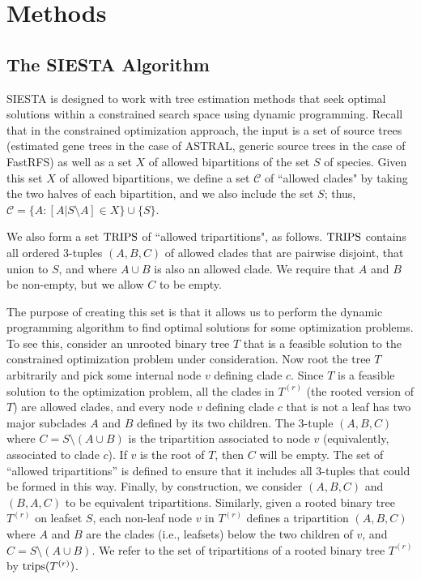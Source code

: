 \section{Methods}

\subsection{The SIESTA Algorithm}

SIESTA is designed to work with tree estimation methods that seek optimal solutions within a constrained search space using dynamic programming. 
Recall that in the constrained optimization approach, the input  is a set of source trees (estimated gene trees in the case of ASTRAL, generic source trees in the case of FastRFS) as well as a set $X$ of allowed bipartitions of the set $S$ of species.
Given this set $X$ of allowed bipartitions, we define a set $\mathcal{C}$ of ``allowed clades" by taking the two halves of each bipartition, and we also include the set $S$; thus, $\mathcal{C} = \{A: [A|S \setminus A] \in X \} \cup \{S\}$.

We also form a set $\mathop{\rm TRIPS}$ of ``allowed tripartitions", as follows. 
$\mathop{\rm TRIPS}$ contains all ordered 3-tuples $(A,B,C)$ of allowed clades that are pairwise disjoint, that union to $S$, and where $A \cup B$ is also an allowed clade. 
We require that $A$ and $B$ be non-empty, but we allow $C$ to be empty.

The purpose of creating this set is that it allows us to perform the dynamic programming algorithm to find optimal solutions for some optimization problems.
To see this, consider an unrooted binary tree $T$ that is a feasible solution to the constrained optimization problem under consideration.
Now root the tree $T$ arbitrarily and pick some internal node $v$ defining clade $c$.
Since $T$ is a feasible solution to the optimization problem, all the clades in $T^{(r)}$  (the rooted version of $T$) are allowed clades, and every node $v$ defining clade $c$ that is not a leaf has two major subclades $A$ and $B$ defined by its two children.
The 3-tuple $(A,B,C)$ where $C= S \setminus (A \cup B)$ is the tripartition associated to node $v$ (equivalently, associated to clade $c$).
If $v$ is the root of $T$, then $C$ will be empty.
The set of ``allowed tripartitions'' is defined to ensure that it includes all  3-tuples that could be formed in this way.
 Finally, by construction, we consider   $(A,B,C)$ and $(B,A,C)$  to be equivalent tripartitions.
Similarly, given a rooted binary tree $T^{(r)}$ on leafset $S$, each non-leaf node $v$ in  $T^{(r)}$ defines a tripartition $(A,B,C)$ where $A$ and $B$ are the clades (i.e., leafsets) below the two children of $v$, and $C = S \setminus (A \cup B)$. 
We refer to the set of tripartitions of a rooted binary tree $T^{(r)}$ by $\mathop{\rm trips}(T^{(r)})$.

